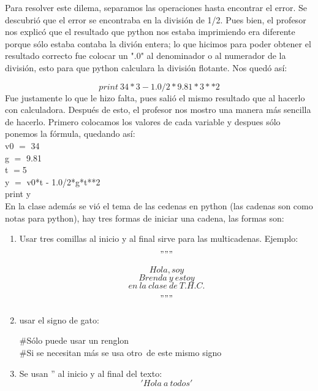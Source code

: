 \documentclass{book}
\begin{document}
	Para resolver este dilema, separamos las operaciones hasta encontrar el error. Se descubrió que el error se encontraba en la división de 1/2.
	Pues bien, el profesor nos explicó que el resultado que python nos estaba imprimiendo era diferente porque sólo estaba contaba la divión entera; lo que hicimos para poder obtener el resultado correcto fue colocar un ".0" al denominador o al numerador de la división, esto para que python calculara la división flotante.
	Nos quedó así:
	
	\[print\ 34*3-1.0/2*9.81*3**2\]
	Fue justamente lo que le hizo falta, pues salió el mismo resultado que al hacerlo con calculadora. 
	Después de esto, el profesor nos mostro una manera más sencilla de hacerlo. Primero colocamos los valores de cada variable y despues sólo ponemos la fórmula, quedando así:\\
	v0 $ =$ 34\\
	g $=$ 9.81\\
	t $= $5\\
	y $=$ v0*t - 1.0/2*g*t**2\\
	print y\\
	
	En la clase además se vió el tema de las cedenas en python (las cadenas son como notas para python), hay tres formas de iniciar una cadena, las formas son: 
	\begin{enumerate}
		\item 
		Usar tres comillas al inicio y al final sirve para las multicadenas. Ejemplo:	
		\["""\]
		\[Hola, soy\]
		\[Brenda\ y\ estoy\]
		\[en\ la\ clase\ de\ T.H.C.\]
		\["""\]	
		\item 
		usar el signo de gato:
		
		\#Sólo puede usar un renglon\\
		\#Si se necesitan más se usa otro\ de este mismo signo\\
		\item 
		Se usan '' al inicio y al final del texto:
		\['Hola\ a\ todos' \]
	\end{enumerate}
	
\end{document}
